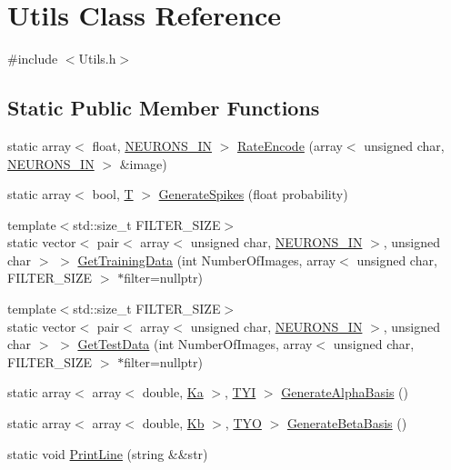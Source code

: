 \hypertarget{class_utils}{}\section{Utils Class Reference}
\label{class_utils}


{\ttfamily \#include $<$Utils.\+h$>$}

\subsection*{Static Public Member Functions}
\begin{DoxyCompactItemize}
\item 
static array$<$ float, \mbox{\hyperlink{_constants_8h_aefc2426e4681da445c7793c98a83c532}{N\+E\+U\+R\+O\+N\+S\+\_\+\+IN}} $>$ \mbox{\hyperlink{class_utils_a35864e66802eaecfd09f42b6bb6078d4}{Rate\+Encode}} (array$<$ unsigned char, \mbox{\hyperlink{_constants_8h_aefc2426e4681da445c7793c98a83c532}{N\+E\+U\+R\+O\+N\+S\+\_\+\+IN}} $>$ \&image)
\item 
static array$<$ bool, \mbox{\hyperlink{_constants_8h_a6108cec236ef7a2e1d3259931de87186}{T}} $>$ \mbox{\hyperlink{class_utils_afc5341fe29fd49c62f4a5c1940a09531}{Generate\+Spikes}} (float probability)
\item 
{\footnotesize template$<$std\+::size\+\_\+t F\+I\+L\+T\+E\+R\+\_\+\+S\+I\+ZE$>$ }\\static vector$<$ pair$<$ array$<$ unsigned char, \mbox{\hyperlink{_constants_8h_aefc2426e4681da445c7793c98a83c532}{N\+E\+U\+R\+O\+N\+S\+\_\+\+IN}} $>$, unsigned char $>$ $>$ \mbox{\hyperlink{class_utils_a51476a8078d0e4c0d8a8a979a0fe1da3}{Get\+Training\+Data}} (int Number\+Of\+Images, array$<$ unsigned char, F\+I\+L\+T\+E\+R\+\_\+\+S\+I\+ZE $>$ $\ast$filter=nullptr)
\item 
{\footnotesize template$<$std\+::size\+\_\+t F\+I\+L\+T\+E\+R\+\_\+\+S\+I\+ZE$>$ }\\static vector$<$ pair$<$ array$<$ unsigned char, \mbox{\hyperlink{_constants_8h_aefc2426e4681da445c7793c98a83c532}{N\+E\+U\+R\+O\+N\+S\+\_\+\+IN}} $>$, unsigned char $>$ $>$ \mbox{\hyperlink{class_utils_a2b2c5d01544dc05c20a7b91c80cc1d96}{Get\+Test\+Data}} (int Number\+Of\+Images, array$<$ unsigned char, F\+I\+L\+T\+E\+R\+\_\+\+S\+I\+ZE $>$ $\ast$filter=nullptr)
\item 
static array$<$ array$<$ double, \mbox{\hyperlink{_constants_8h_a63d387da07d2165955fa3ed13918bb31}{Ka}} $>$, \mbox{\hyperlink{_constants_8h_a45bcfb91788c7d66f5de11604fb1eb6e}{T\+YI}} $>$ \mbox{\hyperlink{class_utils_ad04b260c837c763c9b8beb3d529a0be5}{Generate\+Alpha\+Basis}} ()
\item 
static array$<$ array$<$ double, \mbox{\hyperlink{_constants_8h_ad3e444d768e5365a1620b7b5702c4eb8}{Kb}} $>$, \mbox{\hyperlink{_constants_8h_ade2b686fe2ed5231b32fced73d812981}{T\+YO}} $>$ \mbox{\hyperlink{class_utils_a2daba4f860aab2cdc2573c429cd68f07}{Generate\+Beta\+Basis}} ()
\item 
static void \mbox{\hyperlink{class_utils_abb8bb710013ccaad3ef00dd0cd9efb73}{Print\+Line}} (string \&\&str)
\end{DoxyCompactItemize}


